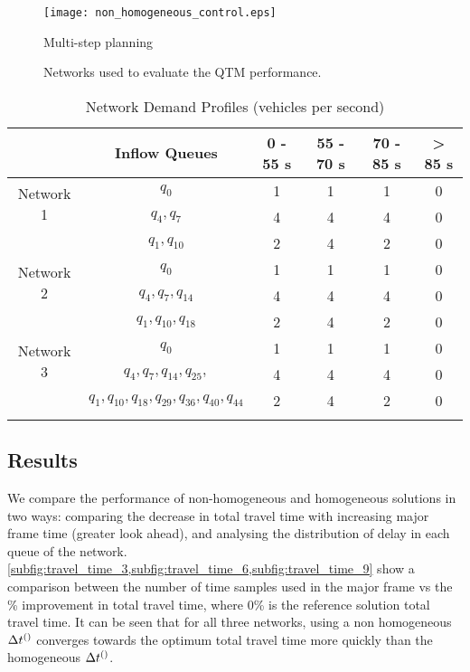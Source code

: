 \begin{figure*}[t!]
\centering
\texttt{[image: non\_homogeneous\_control.eps]}
\caption{Multi-step planning}
\label{fig:multiplan}
\end{figure*}


\begin{figure*}[t!]
\centering
\caption{Networks used to evaluate the QTM performance.}
\label{fig:networks}
\end{figure*}

\begin{table}[h]
\caption{Network Demand Profiles (vehicles per second)}
\label{tab:network_demand}
\centering
\begin{tabular}{cccccc}
\toprule
& Inflow Queues & 0 - 55 s & 55 - 70 s & 70 - 85 s & > 85 s\\
\midrule
\multirow{2}{*}{Network 1}&$q_0$ & 1 & 1 & 1 & 0 \\
&$q_4, q_7$ & 4 & 4 & 4 & 0 \\
&$q_1,q_{10}$& 2 & 4 & 2 & 0 \\
\midrule
\multirow{2}{*}{Network 2}&$q_0$ & 1 & 1 & 1 & 0 \\
&$q_4,q_7,q_{14}$& 4 & 4 & 4 & 0 \\
&$q_1, q_{10},q_{18}$ & 2 & 4 & 2 & 0 \\
\midrule
\multirow{2}{*}{Network 3}&$q_0$ & 1 & 1 & 1 & 0 \\
&$q_4,q_7,q_{14},q_{25},$& 4 & 4 & 4 & 0 \\
&$q_1, q_{10},q_{18},q_{29},q_{36},q_{40},q_{44}$ & 2 & 4 & 2 & 0 \\
\bottomrule\\
\end{tabular}
\end{table}

\subsection{Results}

We compare the performance of non-homogeneous and homogeneous 
solutions in two ways: comparing the decrease in total travel time with 
increasing major frame time (greater look ahead), and analysing the 
distribution of delay in each queue of the network. 
\cref{subfig:travel_time_3,subfig:travel_time_6,subfig:travel_time_9} show a 
comparison between the number of time samples used in the major 
frame vs the \% improvement in total travel time, where 0\% is the reference 
solution total travel time. It can be seen that for all three
networks, using a non homogeneous $\DT[]$ converges towards the optimum 
total travel time more quickly than the 
homogeneous $\DT[]$. 

